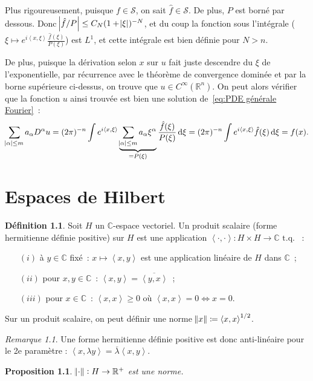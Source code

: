 \documentclass{report}
\newcommand{\C}{{\mathbb C}}
\newcommand{\R}{{\mathbb R}}
\newcommand{\scpr}[2]{\left\langle#1, #2\right\rangle}
\newcommand{\tq}{\text{ t.q. }}
\newtheorem{prp}[thm]{Proposition}
\theoremstyle{definition}
\newtheorem{déf}[thm]{Définition}
\theoremstyle{remark}
\newtheorem*{rmq}{Remarque}
\begin{document}
Plus rigoureusement, puisque $f \in \mathcal S$, on sait $\hat f \in \mathcal S$. De plus, $P$ est borné par dessous. Donc $\abs {\hat f/P} \leq C_N(1+\abs \xi)^{-N}$,
et du coup la fonction sous l'intégrale ($\xi  \mapsto e^{i\scpr x\xi}\frac {\hat f(\xi)}{P(\xi)}$) est $L^1$, et cette intégrale est bien définie pour $N > n$.

De plus, puisque la dérivation selon $x$ sur $u$ fait juste descendre du $\xi$ de l'exponentielle, par récurrence avec le théorème de convergence dominée et par la borne supérieure
ci-dessus, on trouve que $u \in C^\infty(\R^n)$. On peut alors vérifier que la fonction $u$ ainsi trouvée est bien une solution de~\eqref{eq:PDE générale Fourier}~:
\[\sum_{\abs \alpha \leq m}a_\alpha D^\alpha u = (2\pi)^{-n}\int e^{i\scpr x\xi}\underbrace {\sum_{\abs \alpha \leq m}a_\alpha \xi^\alpha}_{=P(\xi)} \frac {\hat f(\xi)}{P(\xi)}\dif\xi
	= (2\pi)^{-n} \int e^{i\scpr x\xi}\hat f(\xi)\dif\xi = f(x).\]

\chapter{Espaces de Hilbert}

\begin{déf} Soit $H$ un $\C$-espace vectoriel. Un produit scalaire (forme hermitienne définie positive) sur $H$ est une application $\scpr \cdot\cdot : H \times H \to \C \tq$~:
\begin{itemize}
	\item[$(i)$]   à $y \in \C$ fixé~: $x \mapsto \scpr xy$ est une application linéaire de $H$ dans $\C$~;
	\item[$(ii)$]  pour $x, y \in \C$~: $\scpr xy = \overline {\scpr yx}$~;
	\item[$(iii)$] pour $x \in \C$~: $\scpr xx \geq 0$ où $\scpr xx = 0 \iff x = 0$.
\end{itemize}

Sur un produit scalaire, on peut définir une norme $\norm x \coloneqq \scpr xx^{1/2}$.
\end{déf}

\begin{rmq} Une forme hermitienne définie positive est donc anti-linéaire pour le 2e paramètre : $\scpr x{\lambda y} = \overline \lambda \scpr xy$.
\end{rmq}

\begin{prp} $\norm \cdot : H \to \R^+$ est une norme.
\end{prp}
\end{document}
